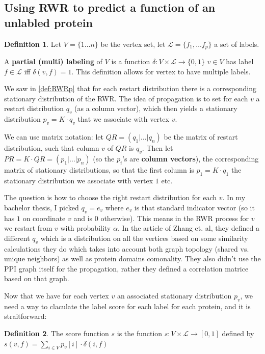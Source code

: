 \documentclass[10pt]{article}
\theoremstyle{definition}
\newtheorem{mydef}{Definition}[section]
\theoremstyle{remark}
\theoremstyle{plain}
\begin{document}
\subsection{Using RWR to predict a function of an unlabled protein}

\begin{mydef}
\label{partialmultilabeling}
Let $V = \{1 \dots n\}$ be the vertex set,
let $\mathcal{L} = \{f_1, \dots f_p\}$ a set of labels.

A \textbf{partial (multi) labeling} of $V$ is a function
$\delta : V \times \mathcal{L} \to \{0,1\}$
$v \in V$ has label $f \in \mathcal{L}$ iff $\delta(v,f)=1$.
This definition allows for vertex to have multiple labels.
\end{mydef}

We saw in \ref{def:RWRp} that for each restart distribution there is
a corresponding stationary distribution of the RWR. The idea of
propagation is to set for each $v$ a restart distribution $q_v$ (as
a column vector), which then yields a stationary distribution $p_v =
K \cdot q_v$ that we associate with vertex $v$.

We can use matrix notation: let $QR = (q_1| \dots | q_n)$ be the
matrix of restart distribution, such that column $v$ of $QR$ is
$q_v$. Then let $PR = K \cdot QR = (p_1| \dots |p_n)$ 
(so the $p_i$'s are \textbf{column vectors}), the
corresponding matrix of stationary distributions, so that the first
column is $p_1 = K \cdot q_1$ the stationary distribution we
associate with vertex $1$ etc.

The question is how to choose the right restart distribution for
each $v$.
In my bachelor thesis, I picked $q_v = e_v$ where $e_v$ is that
standard indicator vector (so it has $1$ on coordinate $v$ and is
$0$ otherwise). This means in the RWR process for $v$ we restart
from $v$ with probability $\alpha$.
In the article of Zhang et. al, they defined a different $q_v$ which
is a distribution on all the vertices based on some similarity
calculations they do which takes into account both graph topology
(shared vs. unique neighbors) as well as protein domains comonality.
They also didn't use the PPI graph itself for the propagation,
rather they defined a correlation matrice based on that graph.

Now that we have for each vertex $v$ an associated stationary
distribution $p_v$, we need a way to claculate the label score for
each label for each protein, and it is straitforward:

\begin{mydef}
\label{def:scorefunction}
The score function $s$ is the function
$s : V \times \mathcal{L} \to [0,1]$ defined by
$s(v,f) = \sum_{i \in V}p_v[i] \cdot \delta(i,f)$
\end{mydef}
\end{document}
